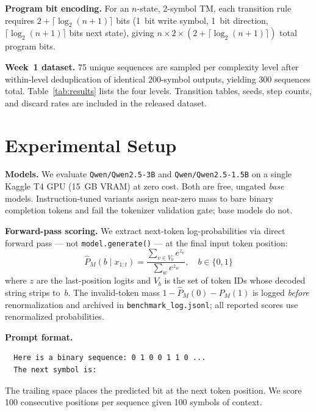 \documentclass{article}
\begin{document}
\textbf{Program bit encoding.}
For an $n$-state, 2-symbol TM, each transition rule requires
$2 + \lceil\log_2(n{+}1)\rceil$ bits (1~bit write symbol,
1~bit direction, $\lceil\log_2(n{+}1)\rceil$ bits next state),
giving $n \times 2 \times (2 + \lceil\log_2(n{+}1)\rceil)$ total program bits.

\textbf{Week~1 dataset.}
75 unique sequences are sampled per complexity level after within-level
deduplication of identical 200-symbol outputs, yielding 300 sequences total.
Table~\ref{tab:results} lists the four levels.
Transition tables, seeds, step counts, and discard rates are included in the
released dataset.

\section{Experimental Setup}
\label{sec:setup}

\textbf{Models.}
We evaluate \texttt{Qwen/Qwen2.5-3B} and \texttt{Qwen/Qwen2.5-1.5B}
\citep{qwen2025qwen25} on a single Kaggle T4 GPU (15~GB VRAM) at zero cost.
Both are free, ungated \emph{base} models.
Instruction-tuned variants assign near-zero mass to bare binary completion
tokens and fail the tokenizer validation gate; base models do not.

\textbf{Forward-pass scoring.}
We extract next-token log-probabilities via direct forward pass —
not \texttt{model.generate()} — at the final input token position:
\begin{equation}
  \hat{P}_M(b \mid x_{1:t})
  = \frac{\displaystyle\sum_{v \in V_b} e^{z_v}}
         {\displaystyle\sum_{w} e^{z_w}},
  \quad b \in \{0, 1\}
  \label{eq:prob}
\end{equation}
where $z$ are the last-position logits and $V_b$ is the set of token IDs
whose decoded string strips to~$b$.
The invalid-token mass $1 - \hat{P}_M(0) - \hat{P}_M(1)$ is logged
\emph{before} renormalization and archived in \texttt{benchmark\_log.jsonl};
all reported scores use renormalized probabilities.

\textbf{Prompt format.}
\begin{verbatim}
  Here is a binary sequence: 0 1 0 0 1 1 0 ...
  The next symbol is:
\end{verbatim}
The trailing space places the predicted bit at the next token position.
We score 100 consecutive positions per sequence given 100 symbols of context.
\end{document}
